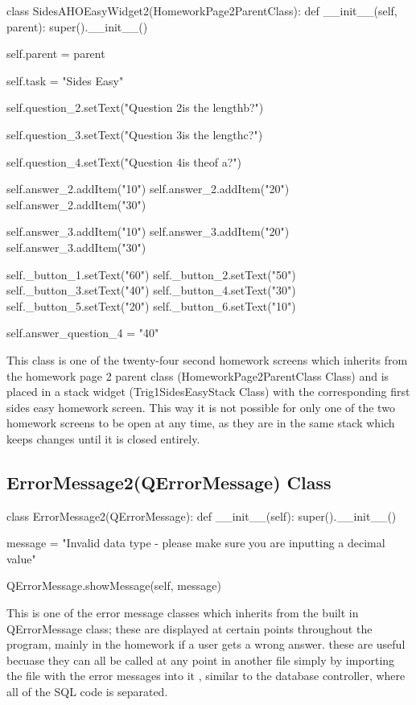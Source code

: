 \begin{python}
class SidesAHOEasyWidget2(HomeworkPage2ParentClass):
    def __init__(self, parent):
        super().__init__()

        self.parent = parent

        self.task = "Sides Easy"

        self.question_2.setText("Question 2\nWhat is the length\nof b?")
        
        self.question_3.setText("Question 3\nWhat is the length\nof c?")
        
        self.question_4.setText("Question 4\nWhat is the\nlength of a?")

        self.answer_2.addItem("10")
        self.answer_2.addItem("20")
        self.answer_2.addItem("30")

        self.answer_3.addItem("10")
        self.answer_3.addItem("20")
        self.answer_3.addItem("30")

        self._button_1.setText("60")
        self._button_2.setText("50")
        self._button_3.setText("40")
        self._button_4.setText("30")
        self._button_5.setText("20")
        self._button_6.setText("10")

        self.answer_question_4 = "40"
\end{python}

This class is one of the twenty-four second homework screens which inherits from the homework page 2 parent class (HomeworkPage2ParentClass Class) and is placed in a stack widget (Trig1SidesEasyStack Class) with the corresponding first sides easy homework screen. This way it is not possible for only one of the two homework screens to be open at any time, as they are in the same stack which keeps changes until it is closed entirely.

\subsection{ErrorMessage2(QErrorMessage) Class}

\begin{python}
class ErrorMessage2(QErrorMessage):
    def __init__(self):
        super().__init__()
        
        message = "Invalid data type - please make sure you are inputting a decimal value"

        QErrorMessage.showMessage(self, message)
\end{python}

This is one of the error message classes which inherits from the built in QErrorMessage class; these are displayed at certain points throughout the program, mainly in the homework if a user gets a wrong answer. these are useful becuase they can all be called at any point in another file simply by importing the file with the error messages into it , similar to the database controller, where all of the SQL code is separated.

